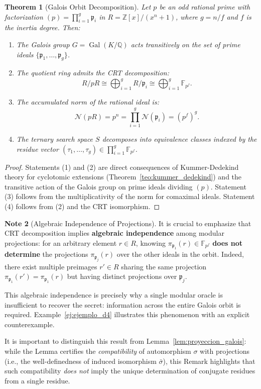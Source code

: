 \documentclass[11pt,a4paper]{article}
\theoremstyle{plain}
\newtheorem{teorema}{Theorem}[section]
\theoremstyle{definition}
\newtheorem{remark}[teorema]{Note}
\numberwithin{equation}{section}
\newcommand{\QQ}{\mathbb{Q}}
\newcommand{\ZZ}{\mathbb{Z}}
\newcommand{\FF}{\mathbb{F}}
\newcommand{\cN}{\mathcal{N}}
\newcommand{\fkp}{\mathfrak{p}}
\newcommand{\Gal}{\operatorname{Gal}}
\begin{document}
\begin{teorema}[Galois Orbit Decomposition]
\label{teo:descomposicion_orbita}
Let $p$ be an odd rational prime with factorization $(p) = \prod_{i=1}^g \fkp_i$ in $R = \ZZ[x]/(x^n+1)$, where $g = n/f$ and $f$ is the inertia degree. Then:
\begin{enumerate}
    \item The Galois group $G = \Gal(K/\QQ)$ acts transitively on the set of prime ideals $\{\fkp_1, \dots, \fkp_g\}$.
    \item The quotient ring admits the CRT decomposition:
    \begin{equation}
    R/pR \cong \bigoplus_{i=1}^g R/\fkp_i \cong \bigoplus_{i=1}^g \FF_{p^f}.
    \end{equation}
    \item The accumulated norm of the rational ideal is:
    \begin{equation}
    \cN(pR) = p^n = \prod_{i=1}^g \cN(\fkp_i) = (p^f)^g.
    \end{equation}
    \item The ternary search space $S$ decomposes into equivalence classes indexed by the residue vector $(\tau_1, \dots, \tau_g) \in \prod_{i=1}^g \FF_{p^f}$.
\end{enumerate}
\end{teorema}

\begin{proof}
Statements (1) and (2) are direct consequences of Kummer-Dedekind theory for cyclotomic extensions (Theorem~\ref{teo:kummer_dedekind}) and the transitive action of the Galois group on prime ideals dividing $(p)$. Statement (3) follows from the multiplicativity of the norm for comaximal ideals. Statement (4) follows from (2) and the CRT isomorphism.
\end{proof}

\begin{remark}[Algebraic Independence of Projections]
\label{rem:independencia_proyecciones}
It is crucial to emphasize that CRT decomposition implies \textbf{algebraic independence} among modular projections: for an arbitrary element $r \in R$, knowing $\pi_{\fkp_1}(r) \in \FF_{p^f}$ \textbf{does not determine} the projections $\pi_{\fkp_j}(r)$ over the other ideals in the orbit. Indeed, there exist multiple preimages $r' \in R$ sharing the same projection $\pi_{\fkp_1}(r') = \pi_{\fkp_1}(r)$ but having distinct projections over $\fkp_j$.

This algebraic independence is precisely why a single modular oracle is insufficient to recover the secret: information across the entire Galois orbit is required. Example~\ref{ej:ejemplo_d4} illustrates this phenomenon with an explicit counterexample.

It is important to distinguish this result from Lemma~\ref{lem:proyeccion_galois}: while the Lemma certifies the \emph{compatibility} of automorphism $\sigma$ with projections (i.e., the well-definedness of induced isomorphism $\bar{\sigma}$), this Remark highlights that such compatibility \emph{does not} imply the unique determination of conjugate residues from a single residue.
\end{remark}
\end{document}
